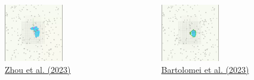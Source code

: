 \documentclass[
  24pt, %
  aspectratio=169, %
]{beamer}
\begin{document}
\begin{frame}
  \begin{columns}
    \begin{column}{.5\textwidth}
      \begin{figure}
        \centering
        \includegraphics[width=0.6\textwidth]{racer}\\
        \href{run:Images/racer_x10.webm}{Zhou et al. (2023)}
      \end{figure}
    \end{column}
    \begin{column}{.5\textwidth}
      \begin{figure}
        \centering
        \includegraphics[width=0.6\textwidth]{fame}\\
        \href{run:Images/fame_x10.webm}{Bartolomei et al. (2023)}
      \end{figure}
    \end{column}
  \end{columns}
\end{frame}
\end{document}
